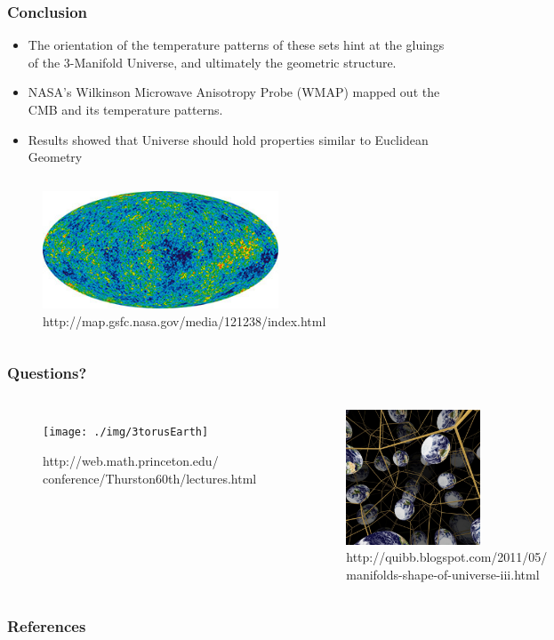 \documentclass[13pt]{beamer}
\begin{document}
\begin{frame}
\frametitle{Conclusion}
  \begin{itemize}
    \item The orientation of the temperature patterns of these sets hint at the gluings of the 3-Manifold Universe, and ultimately the geometric structure.
    \item NASA's Wilkinson Microwave Anisotropy Probe (WMAP) mapped out the CMB and its temperature patterns.
    \item Results showed that Universe should hold properties similar to Euclidean Geometry
  \end{itemize}

  \begin{columns}[c] %
       \centering
        \begin{figure}
          \includegraphics[height=3.5cm]{./img/cmbsky} 
          \caption{http://map.gsfc.nasa.gov/media/121238/index.html}
        \end{figure}
    \end{columns}
\end{frame}

\begin{frame}
\frametitle{Questions?}
   \begin{columns}[c] %
     \centering
      \begin{figure}
        \texttt{[image: ./img/3torusEarth]} %
        \caption{http://web.math.princeton.edu/\\conference/Thurston60th/lectures.html}
      \end{figure}
     \centering
      \begin{figure}
        \includegraphics[height=4cm]{./img/poincarespaceEarth} %
        \caption{http://quibb.blogspot.com/2011/05/\\manifolds-shape-of-universe-iii.html}
      \end{figure}
  \end{columns}
\end{frame}

 \begin{frame}[allowframebreaks]
  \frametitle{References}
  \nocite{*} 
  
\end{frame}
\end{document}
